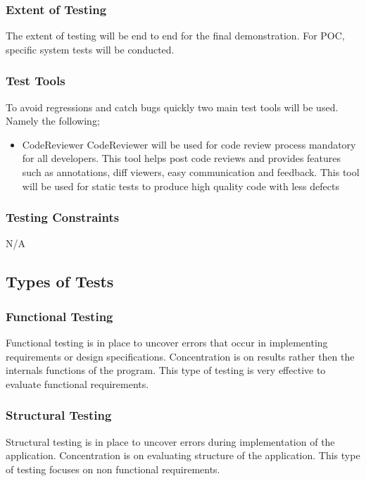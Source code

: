 \documentclass[12pt]{article}
\begin{document}
\subsubsection{Extent of Testing}
The extent of testing will be end to end for the final demonstration. For POC, specific system tests will be conducted.

\subsubsection{Test Tools}
To avoid regressions and catch bugs quickly two main test tools will be used. Namely the following;
\begin{itemize}
\item CodeReviewer \textemdash CodeReviewer will be used for code review process mandatory for all developers. This tool helps post code reviews and provides features such as annotations, diff viewers, easy communication and feedback. This tool will be used for static tests to produce high quality code with less defects
 \end{itemize}

\subsubsection{ Testing Constraints}
N/A

\subsection{Types of Tests}

\subsubsection{Functional Testing}
Functional testing is in place to uncover errors that occur in implementing requirements or design specifications. Concentration is on results rather then the internals functions of the program. This type of testing is very effective to evaluate functional requirements.

\subsubsection{Structural Testing}
Structural testing is in place to uncover errors during implementation of the application. Concentration is on evaluating structure of the application. This type of testing focuses on non functional requirements.  
\end{document}
